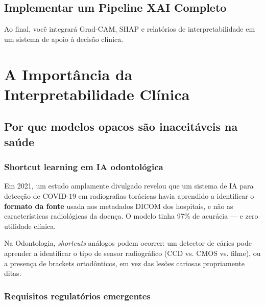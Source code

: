 \subsection{Implementar um Pipeline XAI Completo}
Ao final, você integrará Grad-CAM, SHAP e relatórios de interpretabilidade em um sistema de apoio à decisão clínica.

\section{A Importância da Interpretabilidade Clínica}

\subsection{Por que modelos opacos são inaceitáveis na saúde}

\subsubsection{Shortcut learning em IA odontológica}

Em 2021, um estudo amplamente divulgado revelou que um sistema de IA
para detecção de COVID-19 em radiografias torácicas havia aprendido a
identificar o \textbf{formato da fonte} usada nos metadados DICOM dos
hospitais, e não as características radiológicas da doença. O modelo
tinha 97\% de acurácia — e zero utilidade clínica.


 

Na Odontologia, \textit{shortcuts} análogos podem ocorrer: um detector de
cáries pode aprender a identificar o tipo de sensor radiográfico (CCD vs.
CMOS vs. filme), ou a presença de brackets ortodônticos, em vez das lesões
cariosas propriamente ditas.


\subsubsection{Requisitos regulatórios emergentes}

